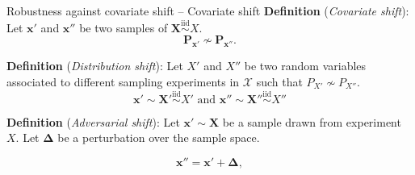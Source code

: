 \begin{frame}{Robustness against covariate shift -- Covariate shift}
	\textbf{Definition} (\emph{Covariate shift}): Let $\bm{x}'$ and $\bm{x}''$ be two samples of $\bm{X} \overset{\text{iid}}{\sim} X$.
		$$
		\mathbf{P}_{\bm{x}'} \not \sim \mathbf{P}_{\bm{x}''}.
		$$
		
	\textbf{Definition} (\emph{Distribution shift}): Let $X'$ and $X''$ be two random variables associated to different sampling 
    experiments in $\mathcal{X}$ such that $P_{X'} \not \sim P_{X''}$.
	$$
        \bm{x}' \sim \bm{X}' \overset{\text{iid}}{\sim} X' \text{ and } \bm{x}'' \sim \bm{X}'' \overset{\text{iid}}{\sim} X''
    $$

	\textbf{Definition} (\emph{Adversarial shift}): Let $\bm{x}' \sim \bm{X}$ be a sample drawn from experiment
    $X$. Let $\bm{\Delta}$ be a perturbation over
    the sample space.

    $$
    \bm{x}'' = \bm{x}' + \bm{\Delta},
    $$
\end{frame}


